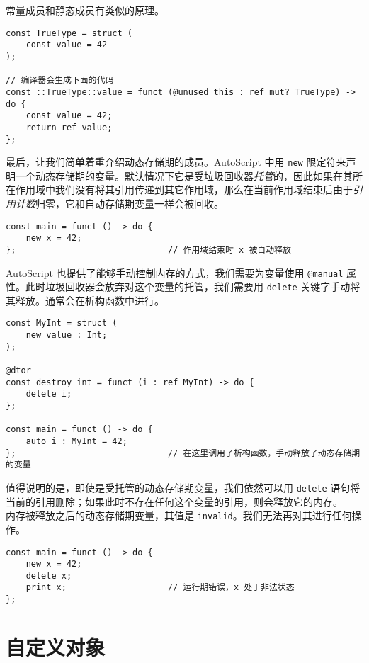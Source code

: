 常量成员和静态成员有类似的原理。

\begin{lstlisting}
const TrueType = struct (
	const value = 42
);

// 编译器会生成下面的代码
const ::TrueType::value = funct (@unused this : ref mut? TrueType) -> do {
	const value = 42;
	return ref value;
};
\end{lstlisting}

最后，让我们简单着重介绍动态存储期的成员。AutoScript 中用 \lstinline!new! 限定符来声明一个动态存储期的变量。默认情况下它是受垃圾回收器\emph{托管}的，因此如果在其所在作用域中我们没有将其引用传递到其它作用域，那么在当前作用域结束后由于\emph{引用计数}归零，它和自动存储期变量一样会被回收。

\begin{lstlisting}
const main = funct () -> do {
    new x = 42;
};								// 作用域结束时 x 被自动释放
\end{lstlisting}

AutoScript 也提供了能够手动控制内存的方式，我们需要为变量使用 \lstinline!@manual! 属性。此时垃圾回收器会放弃对这个变量的托管，我们需要用 \lstinline!delete! 关键字手动将其释放。通常会在析构函数中进行。

\begin{lstlisting}
const MyInt = struct (
    new value : Int;
);

@dtor
const destroy_int = funct (i : ref MyInt) -> do {
    delete i;
};

const main = funct () -> do {
    auto i : MyInt = 42;
};								// 在这里调用了析构函数，手动释放了动态存储期的变量
\end{lstlisting}

值得说明的是，即使是受托管的动态存储期变量，我们依然可以用 \lstinline!delete! 语句将当前的引用删除；如果此时不存在任何这个变量的引用，则会释放它的内存。 \\

内存被释放之后的动态存储期变量，其值是 \lstinline!invalid!。我们无法再对其进行任何操作。

\begin{minipage}[c]{0.95\textwidth}
\vspace{1.0em}
\begin{lstlisting}
const main = funct () -> do {
    new x = 42;
    delete x;
    print x;					// 运行期错误，x 处于非法状态
};
\end{lstlisting}
\end{minipage}


\section{自定义对象}

